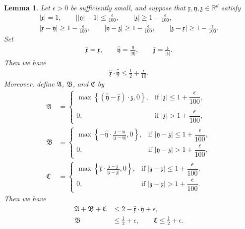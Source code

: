 \documentclass[10pt,a4paper]{amsart}
\newtheorem{lemma}[theorem]{Lemma}
\numberwithin{equation}{section}
\begin{document}
\begin{lemma}\label{mathfraklem}
Let $\epsilon>0$ be sufficiently small, and suppose that $\mathfrak{x},\mathfrak{y},\mathfrak{z}\in\mathbb{R}^d$ satisfy
\begin{align*}
|\mathfrak{x}|=1,\qquad
\left||\mathfrak{y}|-1\right|\leq\frac{\epsilon}{100},\qquad
|\mathfrak{z}|\geq1-\frac{\epsilon}{100},
\\
|\mathfrak{x}-\mathfrak{y}|\geq1-\frac{\epsilon}{100},\qquad
|\mathfrak{y}-\mathfrak{z}|\geq1-\frac{\epsilon}{100},\qquad
|\mathfrak{z}-\mathfrak{x}|\geq1-\frac{\epsilon}{100}.
\end{align*}
Set
\begin{align*}
\hat{\mathfrak{x}}=\mathfrak{x},\qquad
\hat{\mathfrak{y}}=\frac{\mathfrak{y}}{|\mathfrak{y}|},\qquad
\hat{\mathfrak{z}}=\frac{\mathfrak{z}}{|\mathfrak{z}|}.
\end{align*}
Then we have
\begin{align}\label{mathfrakLem0}
\hat{\mathfrak{x}}\cdot\hat{\mathfrak{y}}\leq\frac{1}{2}+\frac{\epsilon}{10}.
\end{align}
Moreover, define $\mathfrak{A}$, $\mathfrak{B}$, and $\mathfrak{C}$ by
\begin{align*}
\mathfrak{A}
&=
\begin{cases}
\displaystyle
\max\left\{
\left(\hat{\mathfrak{y}}-\hat{\mathfrak{x}}\right)
\cdot\hat{\mathfrak{z}},0
\right\},
&\text{if }|\mathfrak{z}|\leq1+\dfrac{\epsilon}{100},
\\
\\
0,
&\text{if }|\mathfrak{z}|>1+\dfrac{\epsilon}{100},
\end{cases}
\\
\mathfrak{B}
&=
\begin{cases}
\displaystyle
\max\left\{
-\hat{\mathfrak{y}}\cdot
\frac{\mathfrak{z}-\mathfrak{y}}
{|\mathfrak{z}-\mathfrak{y}|},0
\right\},
&\text{if }|\mathfrak{y}-\mathfrak{z}|
\leq1+\dfrac{\epsilon}{100},
\\
0,
&\text{if }|\mathfrak{y}-\mathfrak{z}|
>1+\dfrac{\epsilon}{100},
\end{cases}
\\
\mathfrak{C}
&=
\begin{cases}
\displaystyle
\max\left\{
\hat{\mathfrak{x}}\cdot
\frac{\mathfrak{x}-\mathfrak{z}}
{|\mathfrak{x}-\mathfrak{z}|},0
\right\},
&\text{if }|\mathfrak{z}-\mathfrak{x}|
\leq1+\dfrac{\epsilon}{100},
\\
0,
&\text{if }|\mathfrak{z}-\mathfrak{x}|
>1+\dfrac{\epsilon}{100}.
\end{cases}
\end{align*}
Then we have
\begin{align}
\mathfrak{A}+\mathfrak{B}+\mathfrak{C}
&\leq
2-\hat{\mathfrak{x}}\cdot\hat{\mathfrak{y}}+\epsilon,
\label{mathfrakLem1}
\\
\mathfrak{B}
&\leq\frac{1}{2}+\epsilon,
\qquad
\mathfrak{C}\leq\frac{1}{2}+\epsilon.
\label{mathfrakLem2}
\end{align}
\end{lemma}
\end{document}
